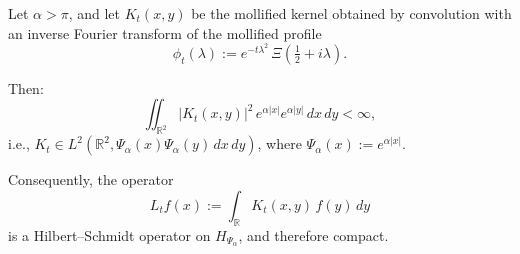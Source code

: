 \begin{lemma}\label{lem:kernel_L2_weighted_bound}
Let \( \alpha > \pi \), and let \( K_t(x,y) \) be the mollified kernel obtained by convolution with an inverse Fourier transform of the mollified profile
\[
\phi_t(\lambda) := e^{-t\lambda^2} \, \Xi\left( \tfrac{1}{2} + i\lambda \right).
\]

Then:
\[
\iint_{\mathbb{R}^2} |K_t(x,y)|^2 \, e^{\alpha|x|} e^{\alpha|y|} \, dx \, dy < \infty,
\]
i.e., \( K_t \in L^2(\mathbb{R}^2, \Psi_\alpha(x)\Psi_\alpha(y)\, dx\, dy) \), where \( \Psi_\alpha(x) := e^{\alpha |x|} \).

\medskip
\noindent Consequently, the operator
\[
L_t f(x) := \int_{\mathbb{R}} K_t(x,y)\, f(y)\, dy
\]
is a Hilbert–Schmidt operator on \( H_{\Psi_\alpha} \), and therefore compact.
\end{lemma}
